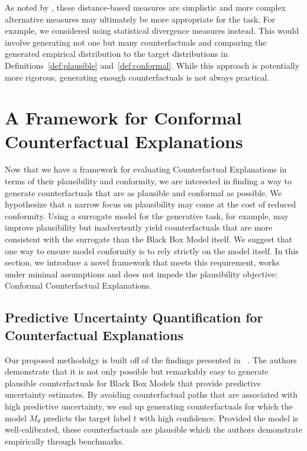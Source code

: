 \documentclass{article}
\begin{document}
As noted by \citet{guidotti2022counterfactual}, these distance-based measures are simplistic and more complex alternative measures may ultimately be more appropriate for the task. For example, we considered using statistical divergence measures instead. This would involve generating not one but many counterfactuals and comparing the generated empirical distribution to the target distributions in Definitions~\ref{def:plausible} and~\ref{def:conformal}. While this approach is potentially more rigorous, generating enough counterfactuals is not always practical. 

\section{A Framework for Conformal Counterfactual Explanations}\label{cce}

Now that we have a framework for evaluating Counterfactual Explanations in terms of their plausibility and conformity, we are interested in finding a way to generate counterfactuals that are as plausible and conformal as possible. We hypothesize that a narrow focus on plausibility may come at the cost of reduced conformity. Using a surrogate model for the generative task, for example, may improve plausibility but inadvertently yield counterfactuals that are more consistent with the surrogate than the Black Box Model itself. We suggest that one way to ensure model conformity is to rely strictly on the model itself. In this section, we introduce a novel framework that meets this requirement, works under minimal assumptions and does not impede the plausibility objective: Conformal Counterfactual Explanations.

\subsection{Predictive Uncertainty Quantification for Counterfactual Explanations}

Our proposed methodolgy is built off of the findings presented in ~\citet{schut2021generating}. The authors demonstrate that it is not only possible but remarkably easy to generate plausible counterfactuals for Black Box Models that provide predictive uncertainty estimates. By avoiding counterfactual paths that are associated with high predictive uncertainty, we end up generating counterfactuals for which the model $M_{\theta}$ predicts the target label $t$ with high confidence. Provided the model is well-calibrated, these counterfactuals are plausible which the authors demonstrate empirically through benchmarks.
\end{document}
